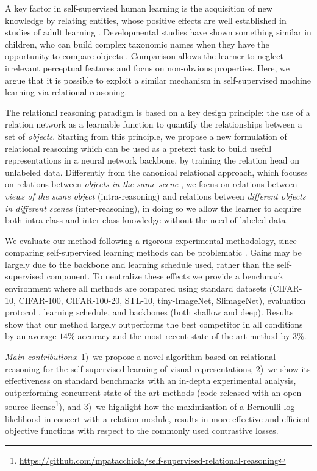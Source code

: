 \documentclass{article}
\begin{document}
A key factor in self-supervised human learning is the acquisition of new knowledge by relating entities, whose positive effects are well established in studies of adult learning \citep{gentner2005relational, goldwater2018relational}. Developmental studies have shown something similar in children, who can build complex taxonomic names when they have the opportunity to compare objects \citep{gentner1999comparison, namy2002making}. Comparison allows the learner to neglect irrelevant perceptual features and focus on non-obvious properties. Here, we argue that it is possible to exploit a similar mechanism in self-supervised machine learning via relational reasoning.

The relational reasoning paradigm is based on a key design principle: the use of a relation network as a learnable function to quantify the relationships between a set of \emph{objects}.
Starting from this principle, we propose a new formulation of relational reasoning which can be used as a pretext task to build useful representations in a neural network backbone, by training the relation head on unlabeled data.
Differently from the canonical relational approach, which focuses on relations between \emph{objects in the same scene} \citep{santoro2017simple}, we focus on relations between \emph{views of the same object} (intra-reasoning) and relations between \emph{different objects in different scenes} (inter-reasoning), in doing so we allow the learner to acquire both intra-class and inter-class knowledge without the need of labeled data.

We evaluate our method following a rigorous experimental methodology, since comparing self-supervised learning methods can be problematic \citep{kolesnikov2019revisiting, musgrave2020metric}. Gains may be largely due to the backbone and learning schedule used, rather than the self-supervised component. To neutralize these effects we provide a benchmark environment where all methods are compared using standard datasets (CIFAR-10, CIFAR-100, CIFAR-100-20, STL-10, tiny-ImageNet, SlimageNet), evaluation protocol \citep{kolesnikov2019revisiting}, learning schedule, and backbones (both shallow and deep). Results show that our method largely outperforms the best competitor in all conditions by an average $14\%$ accuracy and the most recent state-of-the-art method by $3\%$.

\emph{Main contributions}: 1)~we propose a novel algorithm based on relational reasoning for the self-supervised learning of visual representations, 2)~we show its effectiveness on standard benchmarks with an in-depth experimental analysis, outperforming concurrent state-of-the-art methods (code released with an open-source license\footnote{\url{https://github.com/mpatacchiola/self-supervised-relational-reasoning}}), and 3)~we highlight how the maximization of a Bernoulli log-likelihood in concert with a relation module, results in more effective and efficient objective functions with respect to the commonly used contrastive losses.
\end{document}
